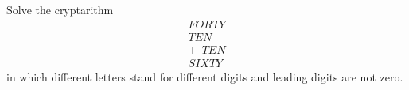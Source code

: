Solve the cryptarithm
\[
\begin{array}{r}
FORTY\\
TEN\\
+\ \ TEN\\
\hline
SIXTY
\end{array}
\]
in which different letters stand for different digits and leading digits are not zero.
